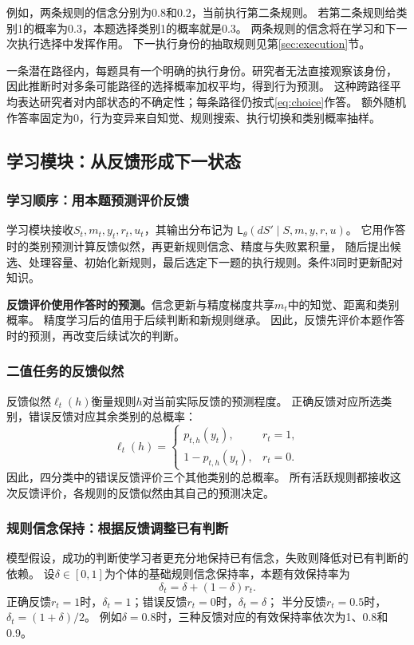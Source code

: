 \documentclass[11pt,a4paper]{article}
\numberwithin{equation}{section}
\newcommand{\Ll}{\mathsf{L}}
\begin{document}
例如，两条规则的信念分别为0.8和0.2，当前执行第二条规则。
若第二条规则给类别1的概率为0.3，本题选择类别1的概率就是0.3。
两条规则的信念将在学习和下一次执行选择中发挥作用。
下一执行身份的抽取规则见第\ref{sec:execution}节。

一条潜在路径内，每题具有一个明确的执行身份。研究者无法直接观察该身份，
因此推断时对多条可能路径的选择概率加权平均，得到行为预测。
这种跨路径平均表达研究者对内部状态的不确定性；每条路径仍按式\eqref{eq:choice}作答。
额外随机作答率固定为0，行为变异来自知觉、规则搜索、执行切换和类别概率抽样。

\subsection{学习模块：从反馈形成下一状态}
\label{sec:learning}

\subsubsection{学习顺序：用本题预测评价反馈}
学习模块接收$S_t,m_t,y_t,r_t,u_t$，其输出分布记为
$\Ll_\theta(dS'\mid S,m,y,r,u)$。
它用作答时的类别预测计算反馈似然，再更新规则信念、精度与失败累积量，
随后提出候选、处理容量、初始化新规则，最后选定下一题的执行规则。条件3同时更新配对知识。

\textbf{反馈评价使用作答时的预测。}信念更新与精度梯度共享$m_t$中的知觉、距离和类别概率。
精度学习后的值用于后续判断和新规则继承。
因此，反馈先评价本题作答时的预测，再改变后续试次的判断。

\subsubsection{二值任务的反馈似然}
反馈似然$\ell_t(h)$衡量规则$h$对当前实际反馈的预测程度。
正确反馈对应所选类别，错误反馈对应其余类别的总概率：
\begin{equation}
\ell_t(h)=
\begin{cases}
p_{t,h}(y_t),&r_t=1,\\
1-p_{t,h}(y_t),&r_t=0.
\end{cases}
\label{eq:binary-feedback}
\end{equation}
因此，四分类中的错误反馈评价三个其他类别的总概率。
所有活跃规则都接收这次反馈评价，各规则的反馈似然由其自己的预测决定。

\subsubsection{规则信念保持：根据反馈调整已有判断}
\label{sec:retention}
模型假设，成功的判断使学习者更充分地保持已有信念，失败则降低对已有判断的依赖。
设$\delta\in[0,1]$为个体的基础规则信念保持率，本题有效保持率为
\begin{equation}
\delta_t=\delta+(1-\delta)r_t.
\label{eq:effective-retention}
\end{equation}
正确反馈$r_t=1$时，$\delta_t=1$；错误反馈$r_t=0$时，$\delta_t=\delta$；
半分反馈$r_t=0.5$时，$\delta_t=(1+\delta)/2$。
例如$\delta=0.8$时，三种反馈对应的有效保持率依次为1、0.8和0.9。
\end{document}
